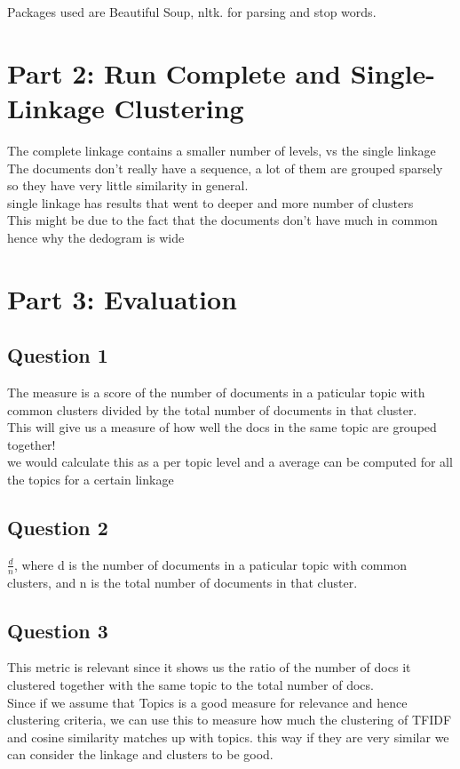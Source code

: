 \documentclass[12pt, oneside]{article}
\begin{document}
Packages used are Beautiful Soup, nltk. for parsing and stop words.

\pagebreak
\section*{Part 2: Run Complete and Single-Linkage Clustering}

The complete linkage contains a smaller number of levels, vs the single linkage\\
The documents don't really have a sequence, a lot of them are grouped
 sparsely so they have very little similarity in general.\\
single linkage has results that went to deeper and more number of clusters\\
This might be due to the fact that the documents don't have much in common hence why the dedogram is wide

\pagebreak
\section*{Part 3: Evaluation}

\subsection*{Question 1}
The measure is a score of the number of documents in a paticular topic with common clusters divided by the total number of documents in that cluster.\\
This will give us a measure of how well the docs in the same topic are grouped together!\\ we would calculate this as a per topic level and a average can be computed for 
all the topics for a certain linkage
\subsection*{Question 2}
$\frac{d}{n}$, where d is the number of documents in a paticular topic with common clusters, and n is the total number of documents in that cluster.
\subsection*{Question 3}
This metric is relevant since it shows us the ratio of the number of docs it clustered together with the same topic to the total number of docs.\\
Since if we assume that Topics  is a good measure for relevance and hence clustering criteria, we can use this to measure how much the clustering of TFIDF and cosine similarity 
matches up with topics. this way if they are very similar we can consider the linkage and clusters to be good.
\end{document}
